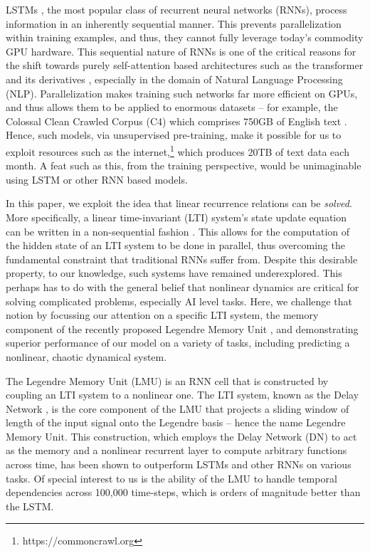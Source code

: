 \documentclass{article}
\begin{document}
LSTMs \cite{hochreiter1997long}, the most popular class of recurrent neural networks (RNNs), process information in an inherently sequential manner. This prevents parallelization within training examples, and thus, they cannot fully leverage today's commodity GPU hardware. This sequential nature of RNNs is one of the critical reasons for the shift towards purely self-attention based architectures such as the transformer and its derivatives \cite{vaswani2017attention, devlin2018bert, brown2020language}, especially in the domain of Natural Language Processing (NLP). Parallelization makes training such networks far more efficient on GPUs, and thus allows them to be applied to enormous datasets -- for example, the Colossal Clean Crawled Corpus (C4) which comprises 750GB of English text \citep{raffel2019exploring}. Hence, such models, via unsupervised pre-training, make it possible for us to exploit resources such as the internet,\footnote{https://commoncrawl.org} which produces 20TB of text data each month. A feat such as this, from the training perspective, would be unimaginable using LSTM or other RNN based models.

In this paper, we exploit the idea that linear recurrence relations can be {\it solved}. More specifically, a linear time-invariant (LTI) system's state update equation can be written in a non-sequential fashion \cite{aastrom2010feedback}. This allows for the computation of the hidden state of an LTI system to be done in parallel, thus overcoming the fundamental constraint that traditional RNNs suffer from. Despite this desirable property, to our knowledge, such systems have remained underexplored. This perhaps has to do with the general belief that nonlinear dynamics are critical for solving complicated problems, especially AI level tasks. Here, we challenge that notion by focussing our attention on a specific LTI system, the memory component of the recently proposed Legendre Memory Unit \citep{voelker2019legendre}, and demonstrating superior performance of our model on a variety of tasks, including predicting a nonlinear, chaotic dynamical system.

The Legendre Memory Unit (LMU) is an RNN cell that is constructed by coupling an LTI system to a nonlinear one. The LTI system, known as the Delay Network \citep{voelker2018improving}, is the core component of the LMU that projects a sliding window of length  of the input signal onto the Legendre basis -- hence the name Legendre Memory Unit. This construction, which employs the Delay Network (DN) to act as the memory and a nonlinear recurrent layer to compute arbitrary functions across time, has been shown to outperform LSTMs and other RNNs on various tasks. Of special interest to us is the ability of the LMU to handle temporal dependencies across 100,000 time-steps, which is orders of magnitude better than the LSTM.
\end{document}
